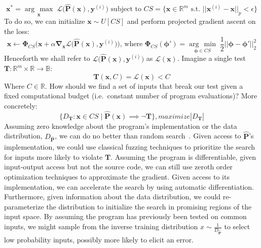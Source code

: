 \documentclass[12pt,initial,twoside,maitrise]{dms}
\newcommand{\argmax}[1]{\underset{#1}{\operatorname{arg}\,\operatorname{max}}\;}
\newcommand{\argmin}[1]{\underset{#1}{\operatorname{arg}\,\operatorname{min}}\;}
\numberwithin{equation}{section}
\numberwithin{table}{chapter}
\numberwithin{figure}{chapter}
\begin{document}
%
\begin{equation}
\mathbf{x}^* = \argmax{\mathbf{x}}\mathcal{L}\big(\mathbf{\hat P}(\mathbf{x}), \mathbf{y}^{(i)}\big) \text{ subject to } CS = \{\mathbf{x} \in \mathbb{R}^m \text{ s.t. } ||\mathbf{x}^{(i)} - \mathbf{x}||_p    < \epsilon\}
\end{equation}
%
To do so, we can initialize $\mathbf{x} \sim U[CS]$ and perform projected gradient ascent on the loss:
%
\begin{equation}\label{eq:projected_gd}
    \mathbf x \leftarrow \bm\Phi_{CS}\Big(\mathbf x + \alpha\mathbf\nabla_{\mathbf x} \mathcal{L}\big(\mathbf{\hat P}(\mathbf{x}), \mathbf{y}^{(i)}\big)\Big) \text{, where }
	\bm\Phi_{CS}(\mathbf \phi') = \argmin{\mathbf \phi \in CS}\frac{1}{2}||\mathbf \phi - \mathbf \phi'||^2_2
\end{equation}
%
Henceforth we shall refer to $\mathcal{L}\big(\mathbf{\hat P}(\mathbf{x}), \mathbf{y}^{(i)}\big)$ as $\mathcal{L}(\mathbf x)$. Imagine a single test $\mathbf{T}: \mathbb{R}^m \times \mathbb{R} \rightarrow \mathbb{B}$:
%
\begin{equation} \label{eq:output_constraint_example}
\mathbf T(\mathbf{x}, C) = \mathcal{L}(\mathbf{x}) < C
\end{equation}
%
Where $C \in \mathbb{R}$. How should we find a set of inputs that break our test given a fixed computational budget (i.e.\ constant number of program evaluations)? More concretely:
%
\begin{equation}
\{ D_\mathbf T: \mathbf x \in CS \mid \mathbf{\hat P}(\mathbf x) \implies \neg \mathbf T \}, maximize |D_\mathbf T|
\end{equation}
%
Assuming zero knowledge about the program's implementation or the data distribution, $D_{\mathbf{\hat P}}$, we can do no better than random search~\citep{wolpert1997no}. Given access to $\mathbf{\hat P}$'s implementation, we could use classical fuzzing techniques to prioritize the search for inputs more likely to violate $\mathbf T$. Assuming the program is differentiable, given input-output access but not the source code, we can still use zeroth order optimization techniques to approximate the gradient. Given access to its implementation, we can accelerate the search by using automatic differentiation. Furthermore, given information about the data distribution, we could re-parameterize the distribution to initialize the search in promising regions of the input space. By assuming the program has previously been tested on common inputs, we might sample from the inverse training distribution $x \sim \frac{1}{D_{\mathbf{\hat P}}}$ to select low probability inputs, possibly more likely to elicit an error.
\end{document}
